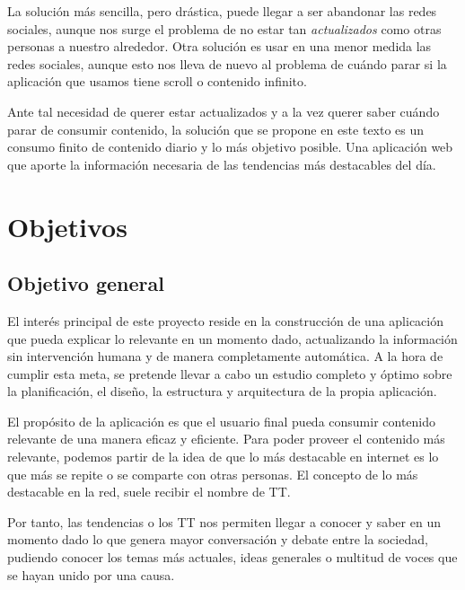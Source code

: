 \vspace{0.3cm}

La solución más sencilla, pero drástica, puede llegar a ser abandonar las redes sociales, aunque nos surge el problema de no estar tan \textit{actualizados} como otras personas a nuestro alrededor. Otra solución es usar en una menor medida las redes sociales, aunque esto nos lleva de nuevo al problema de cuándo parar si la aplicación que usamos tiene scroll o contenido infinito.

\vspace{0.3cm}

Ante tal necesidad de querer estar actualizados y a la vez querer saber cuándo parar de consumir contenido, la solución que se propone en este texto es un consumo finito de contenido diario y lo más objetivo posible. Una aplicación web que aporte la información necesaria de las tendencias más destacables del día.

\section{Objetivos}

\subsection{Objetivo general}
El interés principal de este proyecto reside en la construcción de una aplicación que pueda explicar lo relevante en un momento dado, actualizando la información sin intervención humana y de manera completamente automática. A la hora de cumplir esta meta, se pretende llevar a cabo un estudio completo y óptimo sobre la planificación, el diseño, la estructura y arquitectura de la propia aplicación.

\vspace{0.3cm}

El propósito de la aplicación es que el usuario final pueda consumir contenido relevante de una manera eficaz y eficiente. Para poder proveer el contenido más relevante, podemos partir de la idea de que lo más destacable en internet es lo que más se repite o se comparte con otras personas. El concepto de lo más destacable en la red, suele recibir el nombre de \ac{TT}.

\vspace{0.3cm}

Por tanto, las tendencias o los \ac{TT} nos permiten llegar a conocer y saber en un momento dado lo que genera mayor conversación y debate entre la sociedad, pudiendo conocer los temas más actuales, ideas generales o multitud de voces que se hayan unido por una causa.

